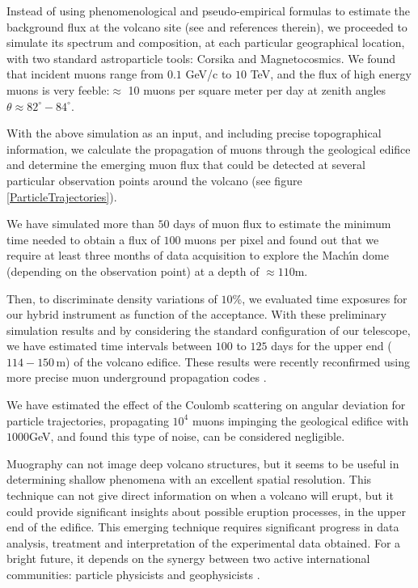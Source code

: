 \documentclass[letterpaper,10pt,titlepage,linenumber]{article}
\begin{document}
Instead of using phenomenological and pseudo-empirical formulas to estimate the background flux at the volcano site (see \cite{TanakaEtal2007} and references therein), we proceeded to simulate its spectrum and composition, at each particular geographical location, with two standard astroparticle tools: {\sc Corsika} and {\sc Magnetocosmics}. We found that incident muons range from $0.1$ GeV/c to $10$ TeV, and the flux of high energy muons is very feeble:$\approx$ 10 muons per square meter per day at zenith angles $\theta \approx 82^\circ-84^\circ$.  

With the above simulation as an input, and including precise topographical information, we calculate the propagation of muons through the geological edifice and determine the emerging muon flux that could be detected at several particular observation points around the volcano (see figure \ref{ParticleTrajectories}). 

We have simulated more than $50$ days of muon flux to estimate the minimum time needed to obtain a flux of $100$ muons per pixel and found out that we require at least three months of data acquisition to explore the Mach\'{\i}n dome (depending on the observation point) at a depth of $\approx 110$m. 

Then, to discriminate density variations of $10$\%, we evaluated time exposures for our hybrid instrument as function of the acceptance. With these preliminary simulation results and by considering the standard configuration of our telescope, we have estimated time intervals between $100$ to $125$ days for the upper end ($114-150$\,m) of the volcano edifice. These results were recently reconfirmed using more precise muon underground propagation codes \cite{Kudryavtsev2009,MossEtal2018}. 

We have estimated the effect of the Coulomb scattering on angular deviation for particle trajectories, propagating $10^{4}$ muons impinging the geological edifice with $1000$GeV, and found this type of noise, can be considered negligible.  

Muography can not image deep volcano structures, but it seems to be useful in determining shallow phenomena with an excellent spatial resolution. This technique can not give direct information on when a volcano will erupt, but it could provide significant insights about possible eruption processes, in the upper end of the edifice. This emerging technique requires significant progress in data analysis, treatment and interpretation of the experimental data obtained. For a bright future, it depends on the synergy between two active international communities: particle physicists and geophysicists \cite{Tanaka2016}.
\end{document}
